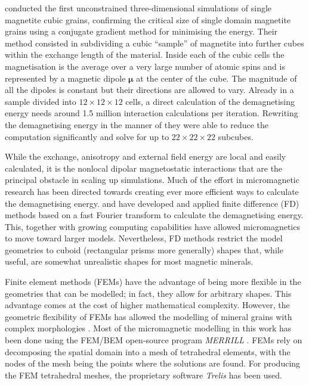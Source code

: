 \citet{Williams1989} conducted the first unconstrained three-dimensional simulations of single magnetite cubic grains, confirming the critical size of single domain magnetite grains using a conjugate gradient method for minimising the energy. Their method consisted in subdividing a cubic ``sample'' of magnetite into further cubes within the exchange length of the material. Inside each of the cubic cells the magnetisation is the average over a very large number of atomic spins and is represented by a magnetic dipole $\boldsymbol{\mu}$ at the center of the cube. The magnitude of all the dipoles is constant but their directions are allowed to vary. Already in a sample divided into $12\times 12\times 12$ cells, a direct calculation of the demagnetising energy needs around 1.5 million interaction calculations per iteration. Rewriting the demagnetising energy in the manner of \citet{Rhodes1954} they were able to reduce the computation significantly and solve for up to $22\times 22\times 22$ subcubes.\par

While the exchange, anisotropy and external field energy are local and easily calculated, it is the nonlocal dipolar magnetostatic interactions that are the principal obstacle in scaling up simulations. Much of the effort in micromagnetic research has been directed towards creating ever more efficient ways to calculate the demagnetising energy. \citet{Fabian1996} and \citet{Wright1997} have developed and applied finite difference (FD) methods based on a fast Fourier transform to calculate the demagnetising energy. This, together with growing computing capabilities have allowed micromagnetics to move toward larger models. Nevertheless, FD methods restrict the model geometries to cuboid (rectangular prisms more generally) shapes that, while useful, are somewhat unrealistic shapes for most magnetic minerals.\par

Finite element methods (FEMs) have the advantage of being more flexible in the geometries that can be modelled; in fact, they allow for arbitrary shapes. This advantage comes at the cost of higher mathematical complexity. However, the geometric flexibility of FEMs has allowed the modelling of mineral grains with complex morphologies \citep{Williams2010}. Most of the micromagnetic modelling in this work has been done using the FEM/BEM open-source program \emph{MERRILL} \citep{OConbhui2017}. FEMs rely on decomposing the spatial domain into a mesh of tetrahedral elements, with the nodes of the mesh being the points where the solutions are found. For producing the FEM tetrahedral meshes, the proprietary software \emph{Trelis} has been used.\par

